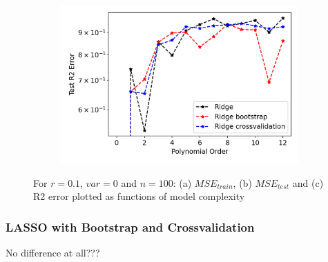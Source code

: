 \begin{figure}
\begin{subfigure}{.5\textwidth}
  \includegraphics[width=.9\linewidth]{Images/ridge13.png}
  \caption{}
  \label{fig:ridge13}
\end{subfigure}
\caption{For $r=0.1$, $var=0$ and $n=100$: (a) $MSE_{train}$, (b) $MSE_{test}$ and (c) R2 error plotted as functions of model complexity}
\label{fig:Ridge_resample 100}
\end{figure}

\subsubsection{LASSO with Bootstrap and Crossvalidation}
No difference at all???

